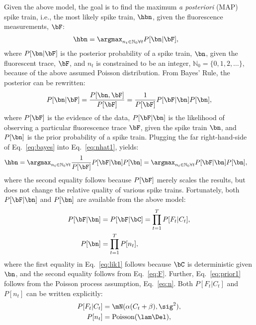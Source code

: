 Given the above model, the goal is to find the maximum \emph{a posteriori} (MAP) spike train, i.e.,  the most likely spike train, $\hbn$,  given the fluorescence measurements, $\bF$:
\begin{align} \label{eq:nhat1} 
\hbn &=  \anx P[\bn | \bF], 
\end{align}
\noindent where $P[\bn | \bF]$ is the posterior probability of a spike train, $\bn$, given the fluorescent trace, $\bF$, and $n_t$ is constrained to be an integer, $\mathbb{N}_0=\{0,1,2,\ldots\}$, because of the above assumed Poisson distribution.  From Bayes' Rule, the posterior can be rewritten:
\begin{align} \label{eq:bayes}
P[\bn | \bF] = \frac{P[\bn, \bF]}{P[\bF]} = \frac{1}{P[\bF]} P[\bF | \bn] P[\bn],
\end{align}
\noindent where $P[\bF]$ is the evidence of the data, $P[\bF | \bn]$ is the likelihood of observing a particular fluorescence trace $\bF$, given the spike train $\bn$, and $P[\bn]$ is the prior probability of a spike train.  Plugging the far right-hand-side of Eq.~\eqref{eq:bayes} into Eq.~\eqref{eq:nhat1}, yields:
\begin{align} \label{eq:nhat2} 
\hbn &=  \anx \frac{1}{P[\bF]} P[\bF | \bn] P[\bn] =  \anx  P[\bF | \bn] P[\bn],
\end{align}
\noindent where the second equality follows because $P[\bF]$ merely scales the results, but does not change the relative quality of various spike trains.  Fortunately, both $P[\bF | \bn]$ and $P[\bn]$ are available from the above model:
\begin{subequations} \label{eq:post1}
\begin{align}
P[\bF | \bn]&= P[\bF | \bC] 	= \prod_{t=1}^T P[F_t | C_t], \label{eq:lik1} \\ 
P[\bn] 		&= \prod_{t=1}^T P[n_t], \label{eq:prior1}
\end{align}
\end{subequations}
\noindent where the first equality in Eq.~\eqref{eq:lik1} follows because $\bC$ is deterministic given $\bn$, and the second equality follows from Eq.~\eqref{eq:F}. Further, Eq.~\eqref{eq:prior1} follows from the Poisson process assumption, Eq.~\eqref{eq:n}.  Both $P[F_t | C_t]$ and $P[n_t]$ can be written explicitly:
\begin{subequations} \label{eq:post2}
\begin{align}
P[F_t | C_t] &= \mN(\alpha(C_t+\beta),\sig^2), \label{eq:lik2} \\
P[n_t] &= \text{Poisson}(\lam \Del), \label{eq:prior2} 
\end{align}
\end{subequations}
